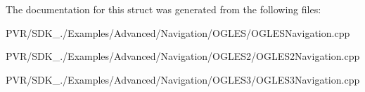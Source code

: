The documentation for this struct was generated from the following files\+:\begin{DoxyCompactItemize}
\item 
P\+V\+R/\+S\+D\+K\+\_./\+Examples/\+Advanced/\+Navigation/\+O\+G\+L\+E\+S/O\+G\+L\+E\+S\+Navigation.\+cpp\item 
P\+V\+R/\+S\+D\+K\+\_./\+Examples/\+Advanced/\+Navigation/\+O\+G\+L\+E\+S2/O\+G\+L\+E\+S2\+Navigation.\+cpp\item 
P\+V\+R/\+S\+D\+K\+\_./\+Examples/\+Advanced/\+Navigation/\+O\+G\+L\+E\+S3/O\+G\+L\+E\+S3\+Navigation.\+cpp\end{DoxyCompactItemize}

